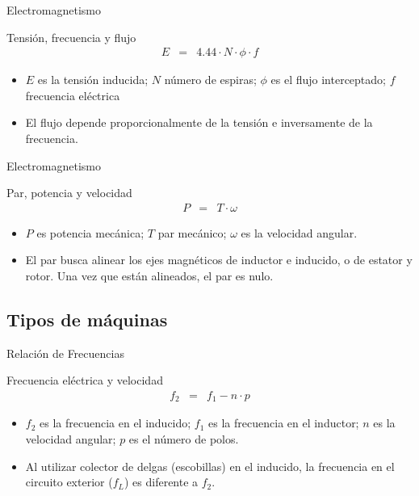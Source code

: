 \documentclass[xcolor={usenames,svgnames,dvipsnames}]{beamer}
\begin{document}
\begin{frame}[label={sec:org9dc8615}]{Electromagnetismo}
\begin{block}{Tensión, frecuencia y flujo}
$$\begin{aligned}
  E & = & 4.44\cdot N\cdot\phi\cdot f\end{aligned}$$

\begin{itemize}
\item \(E\) es la tensión inducida; \(N\) número de espiras; \(\phi\) es el flujo
interceptado; \(f\) frecuencia eléctrica

\item El flujo depende proporcionalmente de la tensión e inversamente de la
frecuencia.
\end{itemize}
\end{block}
\end{frame}

\begin{frame}[label={sec:org9b784be}]{Electromagnetismo}
\begin{block}{Par, potencia y velocidad}
$$\begin{aligned}
  P & = & T\cdot\omega\end{aligned}$$

\begin{itemize}
\item \(P\) es potencia mecánica; \(T\) par mecánico; \(\omega\) es la velocidad
angular.

\item El par busca alinear los ejes magnéticos de inductor e inducido, o de
estator y rotor. Una vez que están alineados, el par es nulo.
\end{itemize}
\end{block}
\end{frame}

\subsection{Tipos de máquinas}
\label{sec:org55c59e4}


\begin{frame}[label={sec:orga0ee3a7}]{Relación de Frecuencias}
\begin{block}{Frecuencia eléctrica y velocidad}
$$\begin{aligned}
  f_{2} & = & f_{1}-n\cdot p\end{aligned}$$

\begin{itemize}
\item \(f_{2}\) es la frecuencia en el inducido; \(f_{1}\) es la frecuencia en
el inductor; \(n\) es la velocidad angular; \(p\) es el número de polos.

\item Al utilizar colector de delgas (escobillas) en el inducido, la
frecuencia en el circuito exterior (\(f_{L}\)) es diferente a \(f_{2}\).
\end{itemize}
\end{block}
\end{frame}
\end{document}
